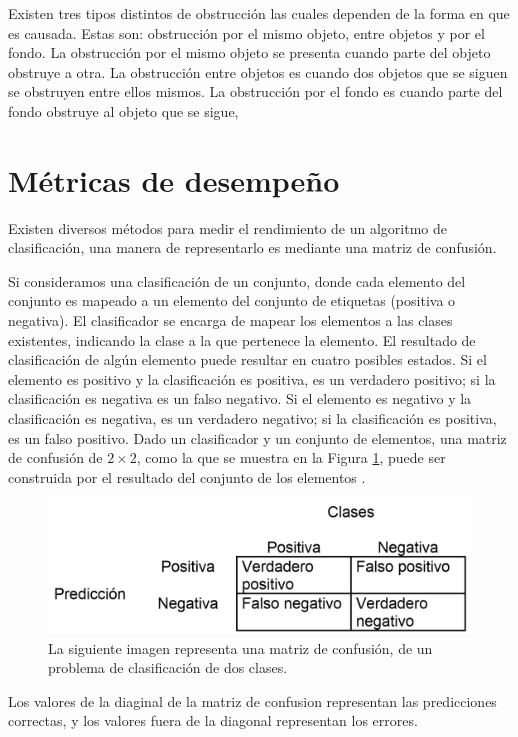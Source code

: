 Existen tres tipos distintos de obstrucción las cuales dependen de la forma en que es causada. Estas son: obstrucción por el mismo objeto, entre objetos y por el fondo. La obstrucción por el mismo objeto se presenta cuando parte del objeto obstruye a otra. La obstrucción entre objetos es cuando dos objetos que se siguen se obstruyen entre ellos mismos. La obstrucción por el fondo es cuando parte del fondo obstruye al objeto que se sigue, \citep{YilmazA.JavedO.andShah2006}




\section{Métricas de desempeño}\label{Metricas}

Existen diversos métodos para medir el rendimiento de un algoritmo de clasificación, una manera de representarlo es mediante una matriz de confusión. 

Si consideramos una clasificación de un conjunto, donde cada elemento del conjunto es mapeado a un elemento del conjunto de etiquetas (positiva o negativa). El clasificador se encarga de mapear los elementos a las clases existentes, indicando la clase a la que pertenece la elemento.
El resultado de clasificación de algún elemento puede resultar en cuatro posibles estados. Si el elemento es positivo y la clasificación es positiva, es un verdadero positivo; si la clasificación es negativa es un falso negativo. Si el elemento es negativo y la clasificación es negativa, es un verdadero negativo; si la clasificación es positiva, es un falso positivo.  
Dado un clasificador y un conjunto de elementos, una matriz de confusión de $2 \times 2$, como la que se muestra en la Figura \ref{fig:Matrix}, puede ser construida por el resultado del conjunto de los elementos \citep{Fawcett2006}.   
\begin{figure}[h!]
\begin{center}
\includegraphics[scale=.4]{./Figures/MatrixConfusion.png}
\end{center}
\caption{La siguiente imagen representa una matriz de confusión, de un problema de clasificación de dos clases.}
\label{fig:Matrix}
\end{figure}
Los valores de la diaginal de la matriz de confusion representan las predicciones correctas, y los valores fuera de la diagonal representan los errores.

